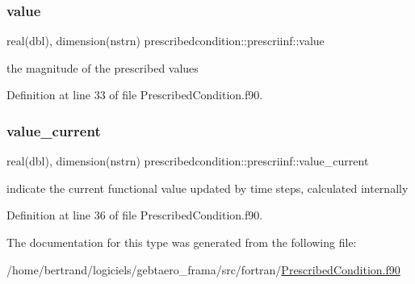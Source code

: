 \subsubsection{\texorpdfstring{value}{value}}
{\footnotesize\ttfamily real(dbl), dimension(nstrn) prescribedcondition\+::prescriinf\+::value\hspace{0.3cm}{\ttfamily [private]}}



the magnitude of the prescribed values 



Definition at line 33 of file Prescribed\+Condition.\+f90.

\mbox{\label{structprescribedcondition_1_1prescriinf_adb8c3bfd5669cc2eccb447f24556ebaf}} 
\subsubsection{\texorpdfstring{value\+\_\+current}{value\_current}}
{\footnotesize\ttfamily real(dbl), dimension(nstrn) prescribedcondition\+::prescriinf\+::value\+\_\+current\hspace{0.3cm}{\ttfamily [private]}}



indicate the current functional value updated by time steps, calculated internally 



Definition at line 36 of file Prescribed\+Condition.\+f90.



The documentation for this type was generated from the following file\+:\begin{DoxyCompactItemize}
\item 
/home/bertrand/logiciels/gebtaero\+\_\+frama/src/fortran/\hyperlink{_prescribed_condition_8f90}{Prescribed\+Condition.\+f90}\end{DoxyCompactItemize}
